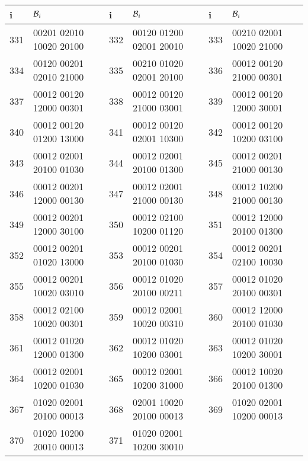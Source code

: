 \begin{tabular}{|l|l||l|l||l|l|}
\hline
 i & $\mathcal{B}_i$  &  i & $\mathcal{B}_i$  &  i & $\mathcal{B}_i$ \\\hline
\hline
{331} &00201 02010 10020 20100 &
{332} &00120 01200 02001 20010 &
{333} &00210 02001 10020 21000 \\
{334} &00120 00201 02010 21000 &
{335} &00210 01020 02001 20100 &
{336} &00012 00120 21000 00301 \\
{337} &00012 00120 12000 00301 &
{338} &00012 00120 21000 03001 &
{339} &00012 00120 12000 30001 \\
{340} &00012 00120 01200 13000 &
{341} &00012 00120 02001 10300 &
{342} &00012 00120 10200 03100 \\
{343} &00012 02001 20100 01030 &
{344} &00012 02001 20100 01300 &
{345} &00012 00201 21000 00130 \\
{346} &00012 00201 12000 00130 &
{347} &00012 02001 21000 00130 &
{348} &00012 10200 21000 00130 \\
{349} &00012 00201 12000 30100 &
{350} &00012 02100 10200 01120 &
{351} &00012 12000 20100 01300 \\
{352} &00012 00201 01020 13000 &
{353} &00012 00201 20100 01030 &
{354} &00012 00201 02100 10030 \\
{355} &00012 00201 10020 03010 &
{356} &00012 01020 20100 00211 &
{357} &00012 01020 20100 00301 \\
{358} &00012 02100 10020 00301 &
{359} &00012 02001 10020 00310 &
{360} &00012 12000 20100 01030 \\
{361} &00012 01020 12000 01300 &
{362} &00012 01020 10200 03001 &
{363} &00012 01020 10200 30001 \\
{364} &00012 02001 10200 01030 &
{365} &00012 02001 10200 31000 &
{366} &00012 10020 20100 01300 \\
{367} &01020 02001 20100 00013 &
{368} &02001 10020 20100 00013 &
{369} &01020 02001 10200 00013 \\
{370} &01020 10200 20010 00013 &
{371} &01020 02001 10200 30010 &
 & \\\hline
\end{tabular}


